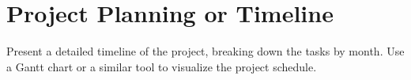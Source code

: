 \section{Project Planning or Timeline}
\label{sec:timeline}
Present a detailed timeline of the project, breaking down the tasks by month. Use a Gantt chart or a similar tool to visualize the project schedule.
